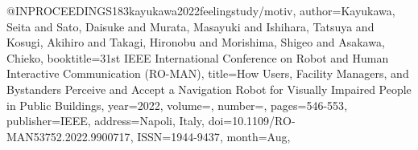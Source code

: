 @INPROCEEDINGS{183kayukawa2022feelingstudy/motiv,
author={Kayukawa, Seita and Sato, Daisuke and Murata, Masayuki and Ishihara, Tatsuya and Kosugi, Akihiro and Takagi, Hironobu and Morishima, Shigeo and Asakawa, Chieko},
booktitle={31st IEEE International Conference on Robot and Human Interactive Communication (RO-MAN)}, 
title={How Users, Facility Managers, and Bystanders Perceive and Accept a Navigation Robot for Visually Impaired People in Public Buildings}, 
year={2022},
volume={},
number={},
pages={546-553},
publisher={IEEE},
address={Napoli, Italy},
doi={10.1109/RO-MAN53752.2022.9900717},
ISSN={1944-9437},
month={Aug},}